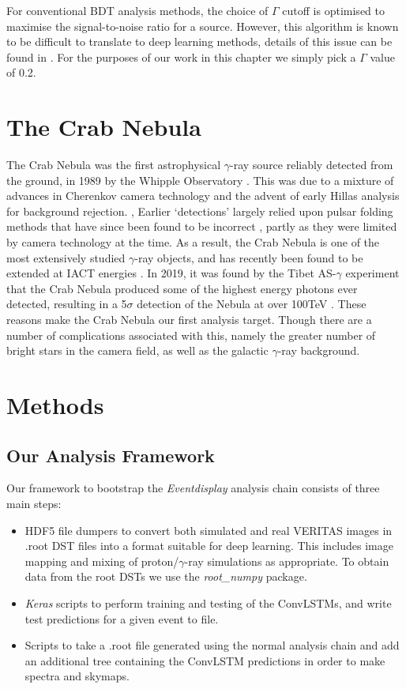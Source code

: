 For conventional BDT analysis methods, the choice of $\Gamma$ cutoff is optimised to maximise the signal-to-noise ratio for a source. However, this algorithm is known to be difficult to translate to deep learning methods, details of this issue can be found in \cite{Shilon}. For the purposes of our work in this chapter we simply pick a $\Gamma$ value of 0.2.

\section{The Crab Nebula}
The Crab Nebula was the first astrophysical $\gamma$-ray source reliably detected from the ground, in 1989 by the Whipple Observatory \cite{weekestev}. This was due to a mixture of advances in Cherenkov camera technology and the advent of early Hillas analysis for background rejection. \cite{hillasparams}, Earlier `detections' largely relied upon pulsar folding methods that have since been found to be incorrect \cite{paulathesis}, partly as they were limited by camera technology at the time. As a result, the Crab Nebula is one of the most extensively studied $\gamma$-ray objects, and has recently been found to be extended at IACT energies \cite{holler}. In 2019, it was found by the Tibet AS-$\gamma$ experiment that the Crab Nebula produced some of the highest energy photons ever detected, resulting in a 5$\sigma$ detection of the Nebula at over 100TeV \cite{asgamma}. These reasons make the Crab Nebula our first analysis target. Though there are a number of complications associated with this, namely the greater number of bright stars in the camera field, as well as the galactic $\gamma$-ray background.

\section{Methods}
\subsection{Our Analysis Framework}
Our framework to bootstrap the \textit{Eventdisplay} analysis chain consists of three main steps:

\begin{itemize}
    \item HDF5 file dumpers to convert both simulated and real VERITAS images in .root DST files into a format suitable for deep learning. This includes image mapping and mixing of proton/$\gamma$-ray simulations as appropriate. To obtain data from the root DSTs we use the \textit{root\_numpy} \cite{rootnumpy} package.
    \item \textit{Keras} scripts to perform training and testing of the ConvLSTMs, and write test predictions for a given event to file.
    \item Scripts to take a .root file generated using the normal analysis chain and add an additional tree containing the ConvLSTM predictions in order to make spectra and skymaps.
\end{itemize}

